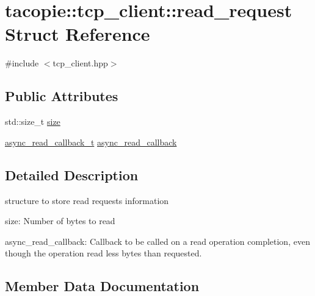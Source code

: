 \hypertarget{structtacopie_1_1tcp__client_1_1read__request}{}\section{tacopie\+:\+:tcp\+\_\+client\+:\+:read\+\_\+request Struct Reference}
\label{structtacopie_1_1tcp__client_1_1read__request}


{\ttfamily \#include $<$tcp\+\_\+client.\+hpp$>$}

\subsection*{Public Attributes}
\begin{DoxyCompactItemize}
\item 
std\+::size\+\_\+t \hyperlink{structtacopie_1_1tcp__client_1_1read__request_ad8b69f61884c60596aface363ca947a3}{size}
\item 
\hyperlink{classtacopie_1_1tcp__client_acdf9dea8bac6c56f7b04ce38b9432322}{async\+\_\+read\+\_\+callback\+\_\+t} \hyperlink{structtacopie_1_1tcp__client_1_1read__request_a3d495e82e38efebf763f595392b0db46}{async\+\_\+read\+\_\+callback}
\end{DoxyCompactItemize}


\subsection{Detailed Description}
structure to store read requests information
\begin{DoxyItemize}
\item size\+: Number of bytes to read
\item async\+\_\+read\+\_\+callback\+: Callback to be called on a read operation completion, even though the operation read less bytes than requested. 
\end{DoxyItemize}

\subsection{Member Data Documentation}
\mbox{\label{structtacopie_1_1tcp__client_1_1read__request_a3d495e82e38efebf763f595392b0db46}} 
